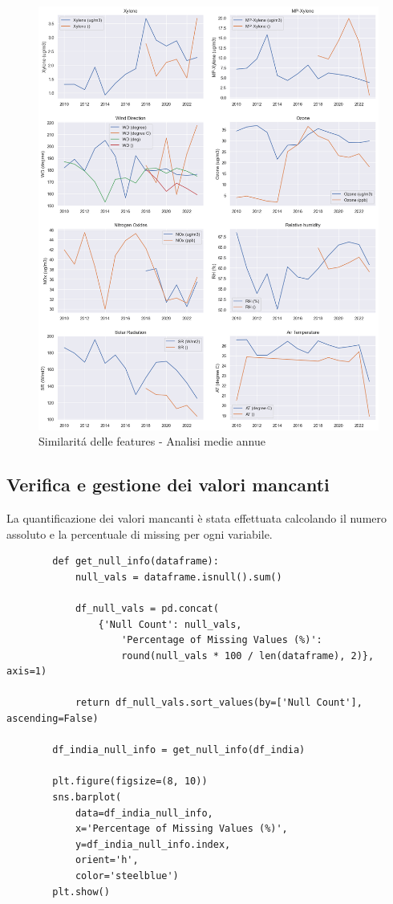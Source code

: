 \documentclass[a4paper,12pt]{report}
\begin{document}
	\begin{figure}[H]
		\centering
		\includegraphics[width=1.0\textwidth]{img/feat_red_pm.png}
		\caption{Similaritá delle features - Analisi medie annue}
	\end{figure}
	
	\subsection{Verifica e gestione dei valori mancanti}
	La quantificazione dei valori mancanti è stata effettuata calcolando il numero assoluto e la percentuale di missing per ogni variabile. \\
	\begin{verbatim}
		def get_null_info(dataframe):
			null_vals = dataframe.isnull().sum()
			
			df_null_vals = pd.concat(
				{'Null Count': null_vals,
					'Percentage of Missing Values (%)': 
					round(null_vals * 100 / len(dataframe), 2)}, axis=1)
			
			return df_null_vals.sort_values(by=['Null Count'], ascending=False)
		
		df_india_null_info = get_null_info(df_india)
		
		plt.figure(figsize=(8, 10))
		sns.barplot(
			data=df_india_null_info, 
			x='Percentage of Missing Values (%)', 
			y=df_india_null_info.index, 
			orient='h', 
			color='steelblue')
		plt.show()
	\end{verbatim}
	
\end{document}
